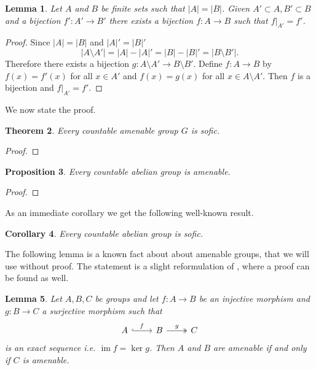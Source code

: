 \documentclass[titlepage, a4paper]{article}
\newcommand{\card}[1]{\left| #1 \right|}
\DeclareMathOperator{\im}{im}
\newtheorem{theorem}{Theorem}[section]
\newtheorem{proposition}[theorem]{Proposition}
\newtheorem{lemma}[theorem]{Lemma}
\newtheorem{corollary}[theorem]{Corollary}
\theoremstyle{remark}
\begin{document}
\begin{lemma}\label{lem:finite_bijections} 
        Let $A$ and $B$ be finite sets such that $|A| = |B|$. Given $A' \subset A, B' \subset B$ and a bijection $f': A' \to B'$ there exists a bijection $f: A \to B$ such that $f|_{A'} = f'$. 
    \end{lemma}
    \begin{proof}
        Since $\card A = \card B$ and $\card A' = \card B'$
        \[
        \card{A \setminus A'} = \card A - \card A' = \card B - \card B' = \card{B \setminus B'}.
        \]
        Therefore there exists a bijection $g: A \setminus A' \to B \setminus B'$. Define $f: A  \to B$ by $f(x) = f'(x)$ for all $x \in A'$ and $f(x)=g(x)$ for all $x \in A \setminus A'$. Then $f$ is a bijection and $f|_{A'} = f'$.
    \end{proof}

We now state the proof.
 	\begin{theorem}\label{thm:folner_sofic}
        Every countable amenable group $G$ is sofic.
    \end{theorem}
    \begin{proof}
        
 	\end{proof}

    \begin{proposition}\label{thm:countable_abelian_folner}
        Every countable abelian group is amenable. 
    \end{proposition}
    \begin{proof}
        
    \end{proof}
    As an immediate corollary we get the following well-known result.
    \begin{corollary}
    	Every countable abelian group is sofic.	
    \end{corollary}
 
	The following lemma is a known fact about about amenable groups, that we will use without proof. 
	The statement is a slight reformulation of {\cite[prop. 4.2.(ii)-(iii)]{kerr_li_ergodic_theory}}, where a proof can be found as well. 
	\begin{lemma}
        \label{lem:amenable_short_exact_sequence}
        Let $A, B, C$ be groups and let $f: A\to B$ be an injective morphism and $g:B\to C$ a surjective morphism such that 
        \[\begin{tikzcd}
            A \arrow[r, "f", hook] & B \arrow[r, "g", two heads] & C
        \end{tikzcd}\]
        is an exact sequence i.e. $\im f = \ker g$. Then $A$ and $B$ are amenable if and only if $C$ is amenable.
    \end{lemma}
\end{document}
